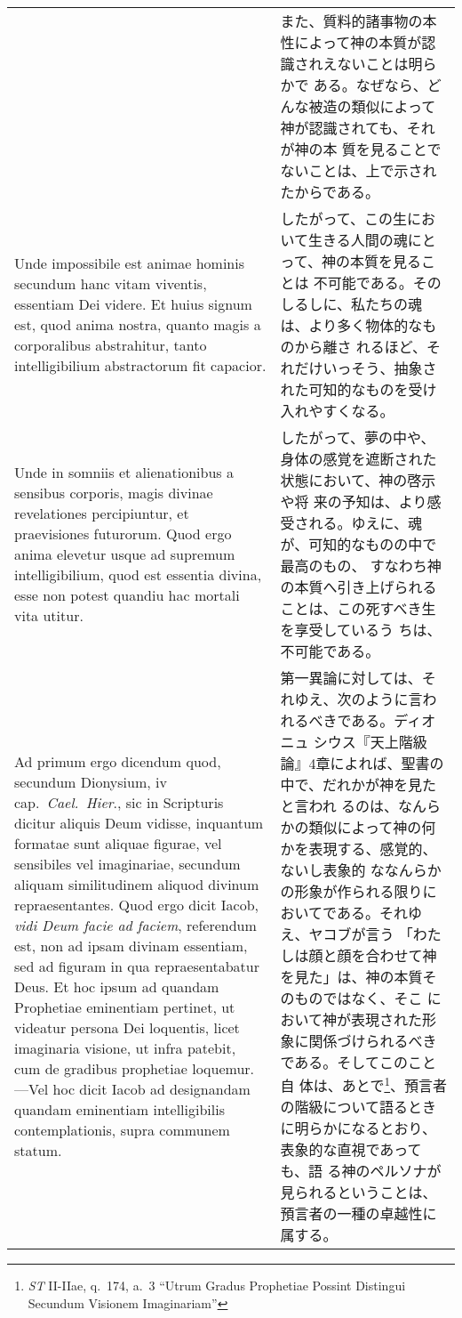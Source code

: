 \documentclass[10pt]{jsarticle} %
\begin{document}
\begin{longtable}{p{21em}p{21em}}
&

また、質料的諸事物の本性によって神の本質が認識されえないことは明らかで
ある。なぜなら、どんな被造の類似によって神が認識されても、それが神の本
質を見ることでないことは、上で示されたからである。

\\

Unde impossibile est animae hominis secundum hanc vitam viventis,
essentiam Dei videre. Et huius signum est, quod anima nostra, quanto
magis a corporalibus abstrahitur, tanto intelligibilium abstractorum
fit capacior.

&

したがって、この生において生きる人間の魂にとって、神の本質を見ることは
不可能である。そのしるしに、私たちの魂は、より多く物体的なものから離さ
れるほど、それだけいっそう、抽象された可知的なものを受け入れやすくなる。

\\

Unde in somniis et alienationibus a sensibus corporis, magis divinae
revelationes percipiuntur, et praevisiones futurorum. Quod ergo anima
elevetur usque ad supremum intelligibilium, quod est essentia divina,
esse non potest quandiu hac mortali vita utitur.

&

したがって、夢の中や、身体の感覚を遮断された状態において、神の啓示や将
来の予知は、より感受される。ゆえに、魂が、可知的なものの中で最高のもの、
すなわち神の本質へ引き上げられることは、この死すべき生を享受しているう
ちは、不可能である。

\\

{\sc Ad primum ergo dicendum} quod, secundum Dionysium, {\sc iv}
cap.~{\it Cael.~Hier}., sic in Scripturis dicitur aliquis Deum
vidisse, inquantum formatae sunt aliquae figurae, vel sensibiles vel
imaginariae, secundum aliquam similitudinem aliquod divinum
repraesentantes. Quod ergo dicit Iacob, {\it vidi Deum facie ad
faciem}, referendum est, non ad ipsam divinam essentiam, sed ad
figuram in qua repraesentabatur Deus. Et hoc ipsum ad quandam
Prophetiae eminentiam pertinet, ut videatur persona Dei loquentis,
licet imaginaria visione, ut infra patebit, cum de gradibus prophetiae
loquemur. ---Vel hoc dicit Iacob ad designandam quandam eminentiam
intelligibilis contemplationis, supra communem statum.

&

第一異論に対しては、それゆえ、次のように言われるべきである。ディオニュ
シウス『天上階級論』4章によれば、聖書の中で、だれかが神を見たと言われ
るのは、なんらかの類似によって神の何かを表現する、感覚的、ないし表象的
ななんらかの形象が作られる限りにおいてである。それゆえ、ヤコブが言う
「わたしは顔と顔を合わせて神を見た」は、神の本質そのものではなく、そこ
において神が表現された形象に関係づけられるべきである。そしてこのこと自
体は、あとで\footnote{{\it ST} II-IIae, q.~174, a.~3 ``Utrum Gradus
Prophetiae Possint Distingui Secundum Visionem Imaginariam''}、預言者
の階級について語るときに明らかになるとおり、表象的な直視であっても、語
る神のペルソナが見られるということは、預言者の一種の卓越性に属する。


\end{longtable}
\end{document}
